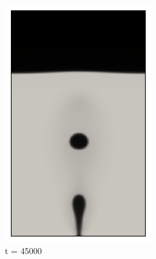 \begin{figure}[H]
\begin{subfigure}{0.25\textwidth}
		\includegraphics[width=\linewidth]{figs/cap4/cuda_bb_760_s45}
		\caption{t = 45000}
		\label{fig:8}
	\end{subfigure}\hfil 
	\begin{subfigure}{0.25\textwidth}

\end{subfigure}
\end{figure}
